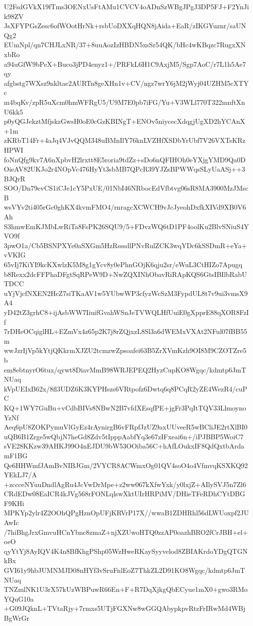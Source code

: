 U2FsdGVkX19fTms3OENxUsFtAMu1CVCV4oADnSzWBgJPgJ3DP5FJ+F2YnJik98ZV
JsXFYPGsZesc6ofWOotHrNk+rsbUoDXXqHQN8jAida+EaR/zIKGYuznr/saUNQg2
EUmNpl/qn7CHJLxNR/37+8uuAozIzHBDN5xsSr54QK/bHc4wKBqzc7RugxXNxbRo
a94uGfW9bPeX+Buco3jPD4enyz1+/PRFkL6H1C9AxjM5/Sgp7AoC/r7L1h5Ae7qy
afgbstg7WXsz9nkltae2AURTn8geXHn1v+CV/ngz7wrY6jM2jWyj04UZHM5cXTYc
m4bqKv/zpR5uXcm0hmWFRgU5/U9M7E0pb7iFG/Yu+V3WLl770T322mnftXnU6kk5
p0yQGJekztMfjskzGwsH0oE0cGzKBINgT+ENOv5niycecXdqgjUgXD2hYCAnX+1m
zKRbT14Fr+4aJq4VJvQQM348uBMnIlY76knLVZHfXSDbYrUbf7V26VXTsKRzHPWI
foNnQfg9kv7A6nXpbvH2lrxtt8E5roria9tdZz+sDo6nQFIHOh0eYXjgYMD9Qa0D
OieAV82UKJo2r4NOpVc476HyYt3sbMB7QPcR39YJZsBPWWqsSLyUaASj++3BJQrR
SOO/Dn79evCS1iCJe1cY5PxUE/01NbI46NRbocEdVfbtvg06sR8MA3900MzJMscB
wsVYv2ti405rGc0ghKX4kvmFMO4/rnragcXCWCH9vJcJyeohDxfkXIVd9XB0V6Ah
S3hmwEmKJMbLwRiTa8FsPK26SQU9/5+FDvzWQ6tD1PF4oolKu2BlvSNiuS4YVO9f
3pwO1a/Cb5BSNPXYe0aSXGm5HzRsssdlPNvRulZCK3wqYDc6kSSDmR+eYa+vVKIG
65vIj7KiYI9kcKXwlzK5M8g1gYcv8y0ePhnGOjK6qju2sr/eWuL3CtHIZo7Apugq
b8Rexx2dcFFPhaDFgtSqRPeW9D+NwZQXINhObavRiRApKQS6GtsIBIlbRabUTDCC
uYjVjcfNXEN2HcZ7siTKaAV1w5YUbwWP3cfyzWcSzM3FypdUL8t7v9ui3vmsX9A4
yD42tZ3grhC8+ijAsbWW7IiuifGvahWSnJeTVWQLHfUuiE0gXpprE88qXOR8FzIf
7rDHeOCqiglHL+EZmVx4z65p2K7j8rZQjxzL8Sl3a6dWEMxVXAt2NFul07fBB55m
wwJzrIjVp5kYtjQKkrmXJZU2tcmzwZpsoafei63B5ZrXVmKzh9OI8M9CZOTZre5b
em8ebtnyrO6tux/qywt8DiavMmB98WRJEPEQ2HyzCupKO8Wgqc/kdmtp6JmTNUaq
kVpUEIxB62x/8fl3UDZ6K3KYPHszs6VRtpofz6Dwtq6q8PCqR2yZE4WezR4/cuPC
KQ+1WY7GuBu+vCdbBIVs8NBwN2B7vfdXEsqfPE+jgFr3PqItTQV33LlmoynoYzNf
Aeq6pU8ZOKPymuVlGyEz4rAynirgB6vFRpfJzUZ9axUUveeR5wBCliJE2rtXlBI0
uQB6B1Zrge5wQbjN7heGd8Zdv5tIpppAabfYq3e67zIFxeai6n+/iPJBBP5WoiC7
sVE28KKzw39AHKJ99O4nEJDU9bW53OOiba56C+hAfLOukxIF8QdQxtbArdamF1BG
Qe6HHWmfJAmBvNIBJGm/2VYCR8ACWmxOg01QV4soO4o4VfmvqKSXKQ92YEkLJ7/A
+zccceNYuuDndlAgRu4JcVwDrMpe+z2ww067kXfwYxk/y0lxjZ+AIlySVJ5n7Zl6
CRdEDw08EaICR4kJVg568rFONLqlswXktUIrHRPiMV/DHieTFeRDhCYtDBGF9KHi
MPKYp2ylr4Z2OOhQPgHznOpUFjKRVrP17X//wwaB1ZDHRhl56dLWUoxpf2JUAwIc
/7hiBhgJrxGmvuHCnYbnc8zmaZ+njXZUwoHTQ0zzAP0oazhBRO2fCrJBH+el+oeO
qyYtYj8AyIQV4K4n8BfKhgPShp05WzHweRKaySyyvelod8ZBIAKrdoYDgQTGNkBx
GVI61y9hbJUMNMJD08nHYf3vSruFnlEoZ7ThkZL2D91KO8Wgqc/kdmtp6JmTNUaq
TNZmlNK1U3rX57kUzWBPuwR66En+F+R7DqXjkgQbECyue1mX0+gwo3RMoYQuG10a
+G09JQknL+TVtaRjy+7rmxs5UTjFGXNw8wGGQAbypkpvRtzFrIRwMd4WBjBgWrGr

